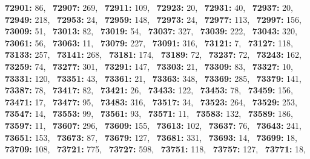\textbf{72901:} 86,\allowbreak~ 
\textbf{72907:} 269,\allowbreak~ 
\textbf{72911:} 109,\allowbreak~ 
\textbf{72923:} 20,\allowbreak~ 
\textbf{72931:} 40,\allowbreak~ 
\textbf{72937:} 20,\allowbreak~ 
\textbf{72949:} 218,\allowbreak~ 
\textbf{72953:} 24,\allowbreak~ 
\textbf{72959:} 148,\allowbreak~ 
\textbf{72973:} 24,\allowbreak~ 
\textbf{72977:} 113,\allowbreak~ 
\textbf{72997:} 156,\allowbreak~ 
\textbf{73009:} 51,\allowbreak~ 
\textbf{73013:} 82,\allowbreak~ 
\textbf{73019:} 54,\allowbreak~ 
\textbf{73037:} 327,\allowbreak~ 
\textbf{73039:} 222,\allowbreak~ 
\textbf{73043:} 320,\allowbreak~ 
\textbf{73061:} 56,\allowbreak~ 
\textbf{73063:} 11,\allowbreak~ 
\textbf{73079:} 227,\allowbreak~ 
\textbf{73091:} 316,\allowbreak~ 
\textbf{73121:} 7,\allowbreak~ 
\textbf{73127:} 118,\allowbreak~ 
\textbf{73133:} 257,\allowbreak~ 
\textbf{73141:} 268,\allowbreak~ 
\textbf{73181:} 174,\allowbreak~ 
\textbf{73189:} 72,\allowbreak~ 
\textbf{73237:} 72,\allowbreak~ 
\textbf{73243:} 162,\allowbreak~ 
\textbf{73259:} 74,\allowbreak~ 
\textbf{73277:} 301,\allowbreak~ 
\textbf{73291:} 147,\allowbreak~ 
\textbf{73303:} 21,\allowbreak~ 
\textbf{73309:} 83,\allowbreak~ 
\textbf{73327:} 10,\allowbreak~ 
\textbf{73331:} 120,\allowbreak~ 
\textbf{73351:} 43,\allowbreak~ 
\textbf{73361:} 21,\allowbreak~ 
\textbf{73363:} 348,\allowbreak~ 
\textbf{73369:} 285,\allowbreak~ 
\textbf{73379:} 141,\allowbreak~ 
\textbf{73387:} 78,\allowbreak~ 
\textbf{73417:} 82,\allowbreak~ 
\textbf{73421:} 26,\allowbreak~ 
\textbf{73433:} 122,\allowbreak~ 
\textbf{73453:} 78,\allowbreak~ 
\textbf{73459:} 156,\allowbreak~ 
\textbf{73471:} 17,\allowbreak~ 
\textbf{73477:} 95,\allowbreak~ 
\textbf{73483:} 316,\allowbreak~ 
\textbf{73517:} 34,\allowbreak~ 
\textbf{73523:} 264,\allowbreak~ 
\textbf{73529:} 253,\allowbreak~ 
\textbf{73547:} 14,\allowbreak~ 
\textbf{73553:} 99,\allowbreak~ 
\textbf{73561:} 93,\allowbreak~ 
\textbf{73571:} 11,\allowbreak~ 
\textbf{73583:} 132,\allowbreak~ 
\textbf{73589:} 186,\allowbreak~ 
\textbf{73597:} 11,\allowbreak~ 
\textbf{73607:} 296,\allowbreak~ 
\textbf{73609:} 155,\allowbreak~ 
\textbf{73613:} 102,\allowbreak~ 
\textbf{73637:} 76,\allowbreak~ 
\textbf{73643:} 241,\allowbreak~ 
\textbf{73651:} 153,\allowbreak~ 
\textbf{73673:} 87,\allowbreak~ 
\textbf{73679:} 127,\allowbreak~ 
\textbf{73681:} 331,\allowbreak~ 
\textbf{73693:} 14,\allowbreak~ 
\textbf{73699:} 18,\allowbreak~ 
\textbf{73709:} 108,\allowbreak~ 
\textbf{73721:} 775,\allowbreak~ 
\textbf{73727:} 598,\allowbreak~ 
\textbf{73751:} 118,\allowbreak~ 
\textbf{73757:} 127,\allowbreak~ 
\textbf{73771:} 18,\allowbreak~ 
